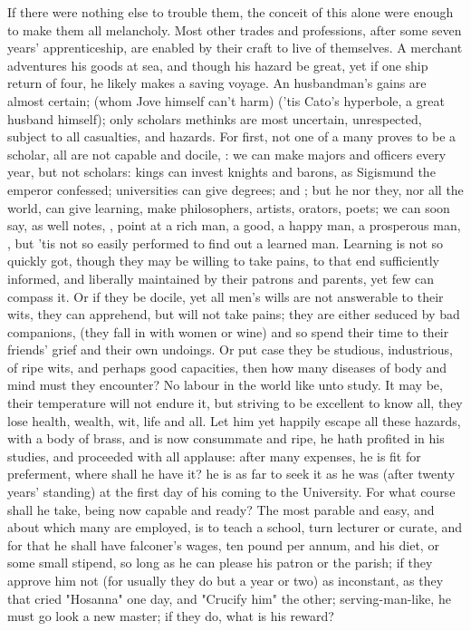 If there were nothing else to trouble them, the conceit of this alone were
enough to make them all melancholy. Most other trades and professions, after
some seven years' apprenticeship, are enabled by their craft to live of
themselves. A merchant adventures his goods at sea, and though his hazard be
great, yet if one ship return of four, he likely makes a saving voyage. An
husbandman's gains are almost certain;  (whom Jove himself can't harm) ('tis Cato's
hyperbole, a great husband himself); only scholars methinks are most uncertain,
unrespected, subject to all casualties, and hazards. For first, not one of a
many proves to be a scholar, all are not capable and docile,
: we can make majors
and officers every year, but not scholars: kings can invest knights and barons,
as Sigismund the emperor confessed; universities can give degrees; and ; but he nor they, nor all the world,
can give learning, make philosophers, artists, orators, poets; we can soon say,
as \Seneca{} well notes, , point at a rich man, a
good, a happy man, a prosperous man, , but 'tis not so easily performed to find out a learned man.
Learning is not so quickly got, though they may be willing to take pains, to
that end sufficiently informed, and liberally maintained by their patrons and
parents, yet few can compass it. Or if they be docile, yet all men's wills are
not answerable to their wits, they can apprehend, but will not take pains; they
are either seduced by bad companions,  (they fall in with women or wine) and so spend their time to their
friends' grief and their own undoings. Or put case they be studious,
industrious, of ripe wits, and perhaps good capacities, then how many diseases
of body and mind must they encounter? No labour in the world like unto study.
It may be, their temperature will not endure it, but striving to be excellent
to know all, they lose health, wealth, wit, life and all. Let him yet happily
escape all these hazards,  with a body of brass, and is
now consummate and ripe, he hath profited in his studies, and proceeded with
all applause: after many expenses, he is fit for preferment, where shall he
have it? he is as far to seek it as he was (after twenty years' standing) at
the first day of his coming to the University. For what course shall he take,
being now capable and ready? The most parable and easy, and about which many
are employed, is to teach a school, turn lecturer or curate, and for that he
shall have falconer's wages, ten pound per annum, and his diet, or some small
stipend, so long as he can please his patron or the parish; if they approve him
not (for usually they do but a year or two) as inconstant, as
they that cried "Hosanna" one day, and "Crucify him" the
other; serving-man-like, he must go look a new master; if they do, what is his
reward?

